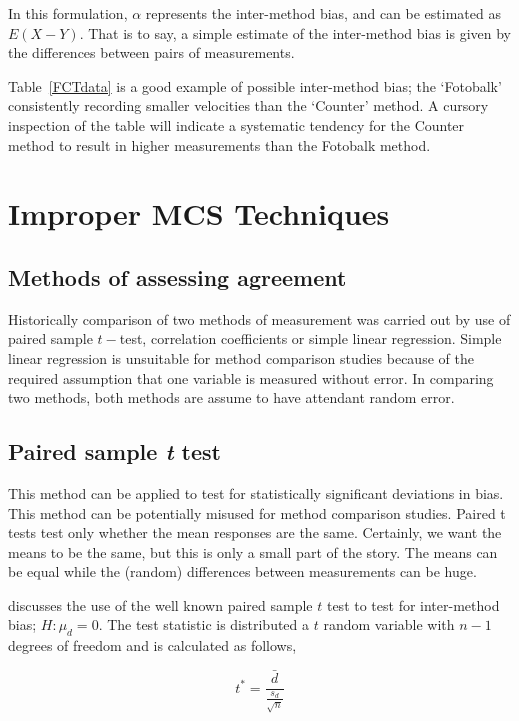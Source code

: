 \documentclass[12pt, a4paper]{report}
\theoremstyle{plain}
\theoremstyle{definition}
\theoremstyle{remark}
\begin{document}
	In this formulation, $\alpha$ represents the inter-method bias, and can be estimated as $E(X-Y)$. That is to say, a simple estimate of the inter-method bias is given by the differences between pairs of measurements.  
	
	Table~\ref{FCTdata} is a good example of possible inter-method bias; the `Fotobalk' consistently recording
	smaller velocities than the `Counter' method. A cursory inspection of the table will indicate a systematic tendency for the Counter method to result in higher measurements than the Fotobalk method. %
	

	\chapter{Improper MCS Techniques}
	
	\section{Methods of assessing agreement}

		
	Historically comparison of two methods of measurement was carried
	out by use of paired sample $t-$test, correlation coefficients or
	simple linear regression. Simple linear regression is unsuitable for method comparison studies because of the required assumption that one variable is measured without error. In comparing two methods, both methods are assume to have attendant random error.

\section{Paired sample \emph{t} test}
This method can be applied to test for statistically significant deviations in bias. This method can be potentially misused for method comparison studies. Paired t tests test only whether the mean responses are the same. Certainly, we want the means to be the same, but this is only a small part of the story. The means can be equal while the (random) differences between measurements can be huge.


\citet{Bartko} discusses the use of the well known paired sample
			$t$ test to test for inter-method bias; $H: \mu_{d}=0$. The test
			statistic is distributed a $t$ random variable with $n-1$ degrees
			of freedom and is calculated as follows,
			
			\begin{equation}
				t^{*} = \frac{\bar{d}}{ \frac{s_{d}}{\sqrt{n}}}
			\end{equation}
			
\end{document}
